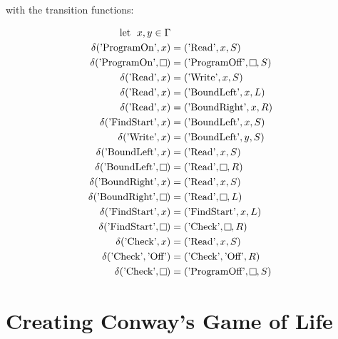 with the transition functions:


\[
    \begin{aligned}
        \text{let \hspace{0.1cm}} x, y \in \Gamma\\
        \delta (\text{'ProgramOn'}, x) &= (\text{'Read'}, x, S)\\
        \delta (\text{'ProgramOn'}, \raisebox{0.1cm}{\fbox{}}) &= (\text{'ProgramOff'}, \raisebox{0.1cm}{\fbox{}}, S)\\
%
        \delta (\text{'Read'}, x) &= (\text{'Write'}, x, S)\\
        \delta (\text{'Read'}, x) &= (\text{'BoundLeft'}, x, L)\\
        \delta (\text{'Read'}, x) &= (\text{'BoundRight'}, x, R)\\
        \delta (\text{'FindStart'}, x) &= (\text{'BoundLeft'}, x, S)\\
%
        \delta (\text{'Write'}, x) &= (\text{'BoundLeft'}, y, S)\\
%
        \delta (\text{'BoundLeft'}, x) &= (\text{'Read'}, x, S)\\
        \delta (\text{'BoundLeft'}, \raisebox{0.1cm}{\fbox{}}) &= (\text{'Read'}, \raisebox{0.1cm}{\fbox{}}, R)\\
%
        \delta (\text{'BoundRight'}, x) &= (\text{'Read'}, x, S)\\
        \delta (\text{'BoundRight'}, \raisebox{0.1cm}{\fbox{}}) &= (\text{'Read'}, \raisebox{0.1cm}{\fbox{}}, L)\\
%
        \delta (\text{'FindStart'}, x) &= (\text{'FindStart'}, x, L)\\
        \delta (\text{'FindStart'}, \raisebox{0.1cm}{\fbox{}}) &= (\text{'Check'}, \raisebox{0.1cm}{\fbox{}}, R)\\
%
        \delta (\text{'Check'}, x) &= (\text{'Read'}, x, S)\\
        \delta (\text{'Check'}, \text{'Off'}) &= (\text{'Check'}, \text{'Off'}, R)\\
        \delta (\text{'Check'}, \raisebox{0.1cm}{\fbox{}}) &= (\text{'ProgramOff'}, \raisebox{0.1cm}{\fbox{}}, S)\\
    \end{aligned}
\]

\section{Creating Conway's Game of Life}\label{sec:ImplementCGoL}

